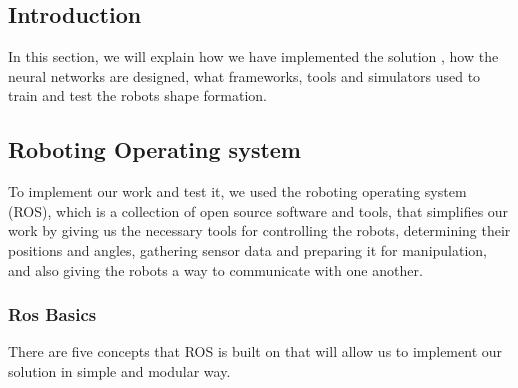 \documentclass[12pt]{extarticle}
\begin{document}
\pagebreak




\subsection{Introduction}
In this section, we will explain how we have implemented the solution , how the neural networks are designed, what frameworks, tools and simulators used to train and test the robots shape formation. 












\subsection{Roboting Operating system}
To implement our work and test it, we used the roboting operating system (ROS), which is  a collection of open source software and tools, that 
 simplifies our work by giving us the necessary tools for controlling the robots, determining their positions and angles, gathering sensor data and preparing it for manipulation, and also giving the robots a way to communicate with one another.

\subsubsection{Ros Basics}
There are five concepts that ROS is built on that will allow us to implement our solution in  simple and modular way.


 
\end{document}
